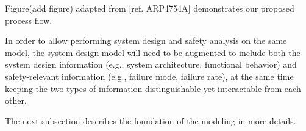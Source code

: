 Figure(add figure) adapted from [ref. ARP4754A] demonstrates our proposed process flow.



In order to allow performing system design and safety analysis on the same model, the system design model will need to be augmented to include both the system design information (e.g., system architecture, functional behavior) and safety-relevant information (e.g., failure mode, failure rate), at the same time keeping the two types of information distinguishable yet interactable from each other.

The next subsection describes the foundation of the modeling in more details.

